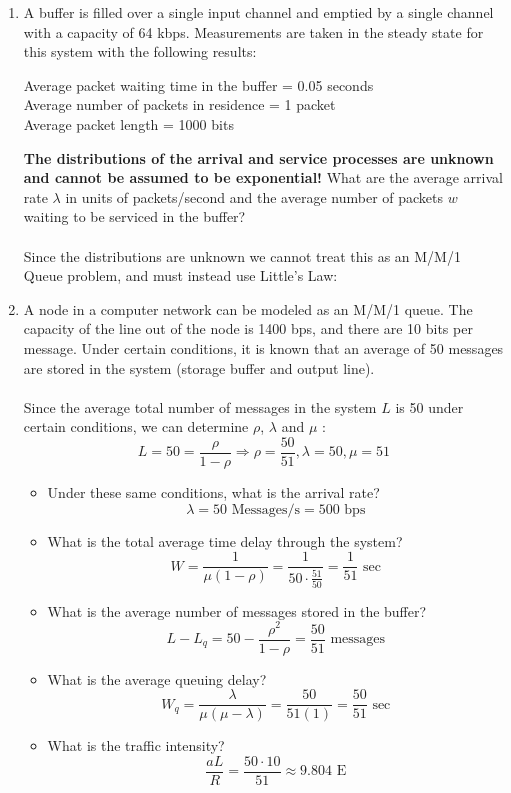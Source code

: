 \documentclass[12pt]{article}
\begin{document}
\begin{enumerate}
  \item A buffer is filled over a single input channel and emptied by a single channel with a capacity of 64 kbps. Measurements are taken in the steady state for this system with the following results:
    \begin{center}
      Average packet waiting time in the buffer = 0.05 seconds\\
      Average number of packets in residence = 1 packet\\
      Average packet length = 1000 bits\\
    \end{center}
    \textbf{The distributions of the arrival and service processes are unknown and cannot be assumed to be exponential!}
What are the average arrival rate $\lambda$ in units of packets/second and the average number of packets $w$ waiting to be serviced in the buffer? \\ \\
Since the distributions are unknown we cannot treat this as an M/M/1 Queue problem, and must instead use Little's Law:
\begin{center}
\fbox{
  \begin{minipage}{15em}
    \[ \lambda = \frac{64000}{1000} = 64 \textrm{ packets/sec} \]
    \[ w = \lambda \cdot 0.05 = 3.2 \textrm{ packets} \]
  \end{minipage}}
\end{center}
\newpage
\item A node in a computer network can be modeled as an M/M/1 queue. The capacity of the line out of the node is 1400 bps, and there are 10 bits per message.  Under certain conditions, it is known that an average of 50 messages are stored in the system (storage buffer and output line). \\ \\
  Since the average total number of messages in the system $L$ is 50 under certain conditions, we can determine $\rho$, $\lambda$ and $\mu$ :
  \[ L = 50 = \frac{\rho}{1-\rho} \Rightarrow \rho = \frac{50}{51} , \lambda = 50, \mu = 51 \]
  
  \begin{itemize} 
    \item Under these same conditions, what is the arrival rate?
      \[ \lambda = 50 \textrm{ Messages/s} = 500 \textrm{ bps} \]
    \item What is the total average time delay through the system?
      \[ W = \frac{1}{\mu(1-\rho)} = \frac{1}{50\cdot \frac{51}{50}} = \frac{1}{51} \textrm{ sec} \]
    \item What is the average number of messages stored in the buffer?
      \[ L - L_q = 50 - \frac{\rho^2}{1-\rho} = \frac{50}{51} \textrm{ messages} \]
    \item What is the average queuing delay?
      \[ W_q = \frac{\lambda}{\mu(\mu - \lambda)} = \frac{50}{51(1)} = \frac{50}{51} \textrm{ sec} \]
    \item What is the traffic intensity?
      \[ \frac{aL}{R} = \frac{50\cdot 10}{51} \approx 9.804 \textrm{ E}\]  
    \end{itemize}
  
  \end{enumerate}
\end{document}
